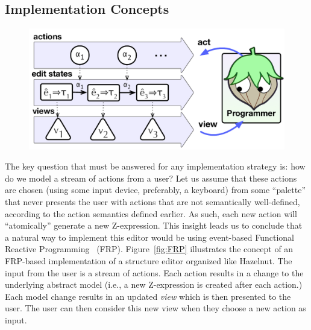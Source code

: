 \subsection{Implementation Concepts}

\begin{figure}
\centering
\includegraphics[width=0.90\columnwidth]{impl-overview2}
\caption{}
\label{fig:impl-overview}
\end{figure}











The key question that must be answered for any implementation strategy is: how do we model a stream of actions from a user? Let us assume that these actions are chosen (using some input device, preferably, a keyboard) from some ``palette'' that never presents the user with actions that are not semantically well-defined, according to the action semantics defined earlier.
As such, each new action will ``atomically'' generate a new Z-expression. 
This insight leads us to conclude that a natural way to implement this editor would be using event-based Functional Reactive Programming~\cite{Wan:2000:FRP:349299.349331} (FRP).
Figure~\ref{fig:FRP} illustrates the concept of an FRP-based implementation of a  structure editor organized like Hazelnut.
The input from the user is a stream of actions.  Each action results in a change to the underlying abstract model (i.e., a new Z-expression is created after each action.)
Each model change results in an updated \emph{view} which is then presented to the user.  The user can then consider this new view when they choose a new action as input.

